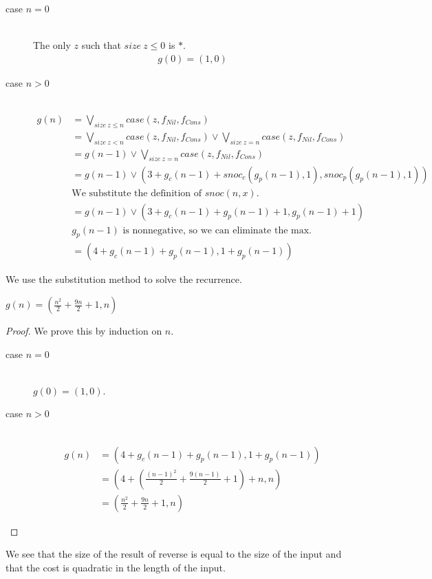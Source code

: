 \begin{description}
  \item[case $n=0$]\hfill \\
    The only $z$ such that $size\ z \leq 0$ is $\ast$.
    \begin{align*}
      g(0) = (1, 0)
    \end{align*}
  \item[case $n>0$]\hfill \\
    \begin{align*}
      g(n) &= \bigvee\limits_{size\ z \leq n} case(z, f_{Nil}, f_{Cons}) \\
           &= \bigvee\limits_{size\ z < n} case(z, f_{Nil}, f_{Cons}) \vee \bigvee\limits_{size\ z = n} case(z, f_{Nil}, f_{Cons}) \\
           &= g(n-1) \vee \bigvee\limits_{size\ z = n} case(z, f_{Nil}, f_{Cons}) \\
           &= g(n-1) \vee (3 + g_c(n-1) + snoc_c(g_p(n-1), 1), snoc_p(g_p(n-1), 1)) \\
           &\text{We substitute the definition of $snoc(n, x)$.} \\
           &= g(n-1) \vee (3 + g_c(n-1) + g_p(n-1) + 1, g_p(n-1) + 1) \\
           &\text{$g_p(n-1)$ is nonnegative, so we can eliminate the max.} \\
           &= (4 + g_c(n-1) + g_p(n-1), 1 + g_p(n-1))
    \end{align*}
\end{description}
%
We use the substitution method to solve the recurrence.
%
\begin{lemma}
  $g(n) = (\frac{n^2}{2} + \frac{9n}{2} + 1, n)$
\end{lemma}
\begin{proof}
  We prove this by induction on $n$.
  \begin{description}
    \item[case $n=0$]\hfill \\
      $g(0) = (1, 0)$.
    \item[case $n>0$]\hfill \\
      \begin{align*}
        g(n) &= (4 + g_c(n-1) + g_p(n-1), 1 + g_p(n-1)) \\
             &= (4 + (\frac{(n-1)^2}{2} + \frac{9(n-1)}{2} + 1) + n, n) \\
             &= (\frac{n^2}{2} + \frac{9n}{2} + 1, n)
      \end{align*}
  \end{description}
\end{proof}
%
We see that the size of the result of reverse is equal to the size of the input
and that the cost is quadratic in the length of the input.

